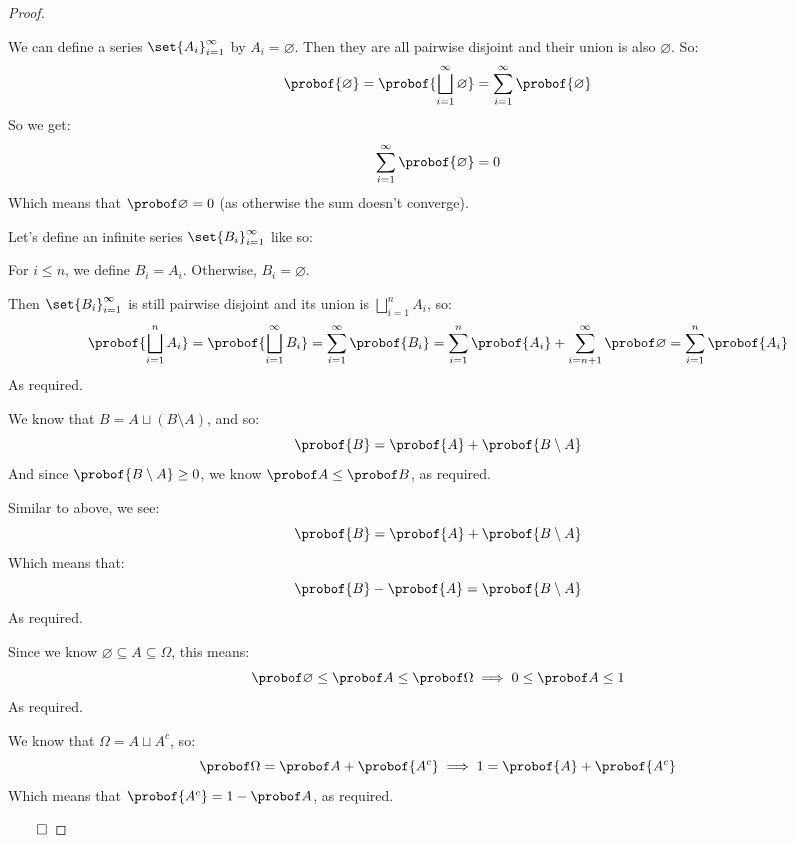 \begin{proof}

	\begin{msecenumerate}[0pt]
		\mitem We can define a series $\set{A_i}_{i=1}^\infty$ by $A_i=\varnothing$.
		Then they are all pairwise disjoint and their union is also $\varnothing$.
		So:
			\[ \probof{\varnothing} = \probof{\bigsqcup_{i=1}^\infty \varnothing} = \sum_{i=1}^\infty\probof{\varnothing} \]
		So we get:
			\[ \sum_{i=1}^\infty\probof{\varnothing} = 0 \]
		Which means that $\probof\varnothing=0$ (as otherwise the sum doesn't converge).

		\mitem Let's define an infinite series $\set{B_i}_{i=1}^\infty$ like so:

		For $i\leq n$, we define $B_i=A_i$. Otherwise, $B_i=\varnothing$.
		
		Then $\set{B_i}_{i=1}^\infty$ is still pairwise disjoint and its union is $\bigsqcup\limits_{i=1}^n A_i$, so:
			\[ \probof{\bigsqcup_{i=1}^n A_i} = \probof{\bigsqcup_{i=1}^\infty B_i} = \sum_{i=1}^\infty\probof{B_i}
			= \sum_{i=1}^n\probof{A_i} + \sum_{i=n+1}^\infty\probof\varnothing = \sum_{i=1}^n\probof{A_i} \]
		As required.

		\mitem We know that $B=A\sqcup(B\setminus A)$, and so:
			\[ \probof{B} = \probof{A} + \probof{B\setminus A} \]
		And since $\probof{B\setminus A}\geq0$, we know $\probof A\leq\probof B$, as required.

		\mitem Similar to above, we see:
			\[ \probof{B} = \probof{A} + \probof{B\setminus A} \]
		Which means that:
			\[ \probof{B} - \probof{A} = \probof{B\setminus A} \]
		As required.

		\mitem Since we know $\varnothing\subseteq A\subseteq\Omega$, this means:
			\[ \probof\varnothing\leq\probof A\leq\probof\Omega \implies 0\leq\probof A\leq 1 \]
		As required.

		\mitem We know that $\Omega=A\sqcup A^c$, so:
			\[ \probof\Omega = \probof A+\probof{A^c} \implies 1=\probof{A}+\probof{A^c} \]
		Which means that $\probof{A^c}=1-\probof A$, as required.
	\end{msecenumerate}

\hfill$\qed$

\end{proof}


